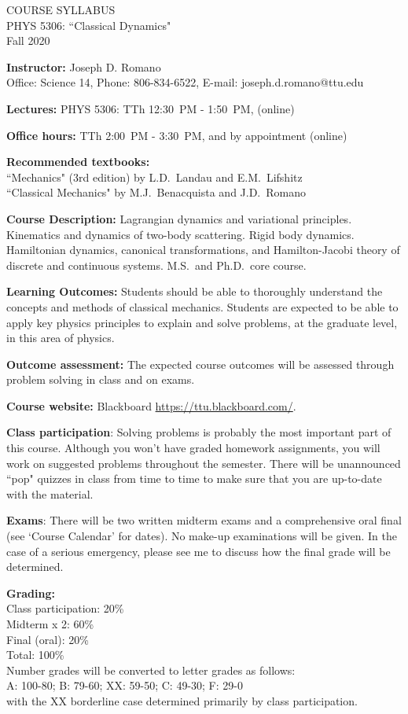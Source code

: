 \documentclass[11pt]{NSF}
\begin{document}
\begin{center}
COURSE SYLLABUS\\
PHYS 5306: ``Classical Dynamics"\\
Fall 2020\\
\end{center}

{\bf Instructor:}
Joseph D. Romano\\
Office: Science 14, Phone: 806-834-6522, E-mail: joseph.d.romano@ttu.edu

{\bf Lectures:}
PHYS 5306: TTh 12:30~PM - 1:50~PM, (online)

{\bf Office hours:}
TTh 2:00~PM - 3:30~PM, and by appointment (online)

{\bf Recommended textbooks:}\\
``Mechanics" (3rd edition) by L.D.~Landau and E.M.~Lifshitz\\
``Classical Mechanics" by M.J.~Benacquista and J.D.~Romano

{\bf Course Description:}
Lagrangian dynamics and variational principles. Kinematics and dynamics of
two-body scattering. Rigid body dynamics. Hamiltonian dynamics, canonical
transformations, and Hamilton-Jacobi theory of discrete and continuous systems.
M.S.\ and Ph.D.\ core course.  

{\bf Learning Outcomes:}
Students should be able to thoroughly understand the concepts and
methods of classical mechanics. Students are expected to be
able to apply key physics principles to explain and solve problems,
at the graduate level, in this area of physics.

{\bf Outcome assessment:} 
The expected course outcomes will be assessed through problem solving 
in class and on exams.

{\bf Course website:}
Blackboard \url{https://ttu.blackboard.com/}.

{\bf Class participation}:
Solving problems is probably the most important part of 
this course.
Although you won't have graded homework assignments, you will 
work on suggested problems throughout the semester.
There will be unannounced ``pop" quizzes in class from time to time 
to make sure that you are up-to-date with the material.

{\bf Exams}:
There will be two written midterm exams and a comprehensive 
oral final (see `Course Calendar' for dates).
No make-up examinations will be given. In the case of a
serious emergency, please see me to discuss how the final
grade will be determined.

{\bf Grading:}\\
Class participation: 20\%\\ 
Midterm x 2: 60\%\\
Final (oral): 20\%\\ 
Total: 100\%\\
Number grades will be converted to letter grades as follows:\\
A: 100-80; B: 79-60; XX: 59-50; C: 49-30; F: 29-0\\ 
with the XX borderline case determined primarily by class participation.
\end{document}
